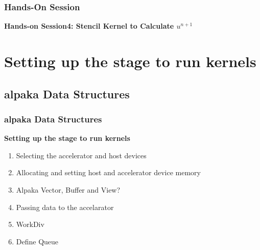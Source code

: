\documentclass[9pt]{beamer}
\begin{document}




\begin{frame}
\frametitle{Hands-On Session}
\begin{center}
      \Huge \textbf{Hands-on Session4: Stencil Kernel to Calculate $u^{n+1}$}
  \end{center}
\end{frame}

\section{Setting up the stage to run kernels}
\subsection{alpaka Data Structures}
\begin{frame}
\frametitle{alpaka Data Structures}
\begin{center}
      \Huge \textbf{Setting up the stage to run kernels}
  \end{center}
\begin{enumerate}
 \item Selecting the accelerator and host devices
 \item Allocating and setting host and accelerator device memory
 \item Alpaka Vector, Buffer and View?
 \item Passing data to the accelarator
 \item WorkDiv
 \item Define Queue
\end{enumerate}
    \end{frame}
\end{document}

